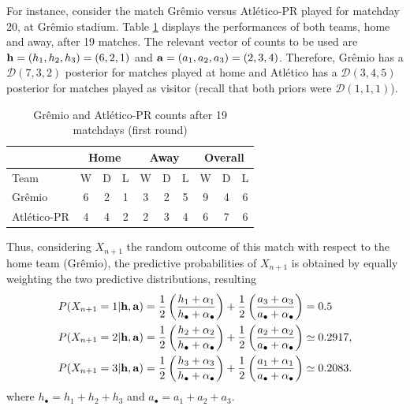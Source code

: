 \documentclass[journal,article,accept,moreauthors,pdftex,12pt,a4paper]{mdpi}
\begin{document}
    For instance, consider the match Gr\^emio versus Atl\'etico-PR played for matchday 20, at Gr\^emio stadium. Table \ref{tab:counts} displays the performances of both teams, home and away, after 19
    matches. The relevant vector of counts to be used are ${\bf h}=(h_1,h_2,h_3)=(6,2,1)$ and ${\bf a}=(a_1,a_2,a_3)=(2,3,4)$.
    Therefore, Gr\^emio has a $\mathcal{D}(7,3,2)$ posterior for matches played at home and Atl\'etico has a $\mathcal{D}(3,4,5)$ posterior for matches played as visitor (recall that both priors were
    $\mathcal{D}(1,1,1)$).

    \begin{table}[!h]
        \begin{center}
            \begin{tabular}{lccccccccc}

                \hline
                & \multicolumn{3}{c}{Home} & \multicolumn{3}{c}{Away}& \multicolumn{3}{c}{Overall} \\
                \hline
                \hline
                Team & W & D & L & W & D & L & W & D & L\\
                \hline
                Gr\^emio & 6 & 2 & 1 & 3 & 2 & 5 & 9 & 4 & 6\\
                Atl\'etico-PR & 4 & 4 & 2 & 2 & 3 & 4 & 6 & 7 & 6\\
                \hline
            \end{tabular}
            \caption{Gr\^emio and Atl\'etico-PR counts after 19 matchdays (first round)}\label{tab:counts}
        \end{center}
    \end{table}

    Thus, considering $X_{n + 1}$ the random outcome of this match with
    respect to the home team (Gr\^{e}mio), the predictive probabilities
    of $X_{n + 1}$ is obtained by equally weighting the two predictive
    distributions, resulting
    \begin{align*}
        P(X_{n+1}=1|{\bf h}, {\bf a}) &=
        \frac{1}{2}\left(\frac{h_1+\alpha_1}{h_{\bullet}+\alpha_{\bullet}}\right)+\frac{1}{2}\left(\frac{a_3+\alpha_3}{a_{\bullet}+\alpha_{\bullet}}\right)=0.5
        \\
        P(X_{n+1}=2|{\bf h}, {\bf a}) &=
        \frac{1}{2}\left(\frac{h_2+\alpha_2}{h_{\bullet}+\alpha_{\bullet}}\right)+\frac{1}{2}\left(\frac{a_2+\alpha_2}{a_{\bullet}+\alpha_{\bullet}}\right)\simeq0.2917, \\
        P(X_{n+1}=3|{\bf h}, {\bf a}) &= \frac{1}{2}
        \left(\frac{h_3+\alpha_3}{h_{\bullet}+\alpha_{\bullet}}\right)+\frac{1}{2}\left(\frac{a_1+\alpha_1}{a_{\bullet}+\alpha_{\bullet}}\right)\simeq0.2083.
    \end{align*}
    \noindent where $h_{\bullet}=h_1+h_2+h_3$ and $a_{\bullet}=a_1+a_2+a_3$.
\end{document}
